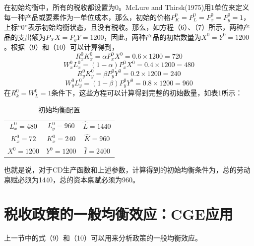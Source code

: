 \documentclass[cn,12pt,math=newtx,citestyle=gb7714-2015,bibstyle=gb7714-2015]{elegantbook}
\begin{document}
	在初始均衡中，所有的税收都设置为0。McLure and Thirsk(1975)用1单位来定义每一种产品或要素作为一单位成本，那么，初始的价格$P_K^0=P_L^0=P_x^0=P_y^0=1$，上标“0”表示初始均衡状态，且没有税收。那么，如方程（6）、（7）所示，两种产品的支出额为$P_XX=P_yY=1200$，因此，两种产品的初始数量为$X^0=Y^0=1200$。根据（9）和（10）可以计算得到，
	\begin{equation}
		R_x^0K_x^0=\alpha P_x^0X^0=0.6 \times 1200=720
	\end{equation}
	\begin{equation}
		W_x^0L_x^0=(1-\alpha) P_x^0X^0=0.4 \times 1200=480
	\end{equation}
	\begin{equation}
		R_y^0K_y^0=\beta P_y^0Y^0=0.2 \times 1200=240
	\end{equation}
	\begin{equation}
		W_y^0L_y^0=(1-\beta) P_y^0Y^0=0.8 \times 1200=960
	\end{equation}
	在$R_k^0=W_L^0=1$条件下，这些方程可以计算得到完整的初始数量，如表1所示：
	
	\begin{table}[!htbp]
		\centering
		\caption{初始均衡配置}
		\begin{tabular}{ccc}
			\hline
			$L^0_x=480$& $L^0_y=960$ & $\hat{L}=1440$ \\
			$K^0_x=72$& $K^0_x=240$ &$\hat{K}=960$  \\
			$X^0=1200$& $Y^0=1200$ & $\hat{I}=2400$ \\
			\hline
		\end{tabular}
	\end{table}
	
	也就是说，对于CD生产函数和上述参数，计算得到的初始均衡条件为，总的劳动禀赋必须为1440，总的资本禀赋必须为960。
	
	
	\section{税收政策的一般均衡效应：CGE应用}
	上一节中的式（9）和（10）可以用来分析政策的一般均衡效应。
\end{document}
